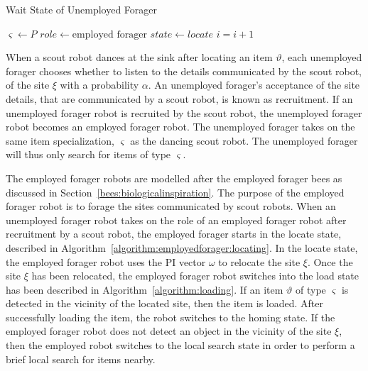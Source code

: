 \begin{algorithm}
\caption{Wait State of Unemployed Forager}
\label{algorithm:unemployedforager:locating}
\begin{algorithmic}[1]
	\State $\varsigma \gets P$
	\State {}
	\State $role \gets \text{employed forager}$
	\State $state \gets locate$
\EndIf
\State $i =i + 1$
\EndFunction
\end{algorithmic}
\end{algorithm}

When a scout robot dances at the sink after locating an item $\vartheta$, each unemployed forager chooses whether to listen to the details communicated by the scout robot, of the site $\xi$ with a probability $\alpha$. An unemployed forager's acceptance of the site details, that are communicated by a scout robot, is known as recruitment. If an unemployed forager robot is recruited by the scout robot, the unemployed forager robot becomes an employed forager robot. The unemployed forager takes on the same item specialization, $\varsigma$ as the dancing scout robot. The unemployed forager will thus only search for items of type $\varsigma$. 

The employed forager robots are modelled after the employed forager bees as discussed in Section~\ref{bees:biologicalinspiration}. The purpose of the employed forager robot is to forage the sites communicated by scout robots. When an unemployed forager robot takes on the role of an employed forager robot after recruitment by a scout robot, the employed forager starts in the locate state, described in Algorithm~\ref{algorithm:employedforager:locating}. In the locate state, the employed forager robot uses the PI vector $\omega$ to relocate the site $\xi$. Once the site $\xi$ has been relocated, the employed forager robot switches into the load state has been described in Algorithm~\ref{algorithm:loading}. If an item $\vartheta$ of type $\varsigma$ is detected in the vicinity of the located site, then the item is loaded. After successfully loading the item, the robot switches to the homing state. If the employed forager robot does not detect an object in the vicinity of the site $\xi$, then the employed robot switches to the local search state in order to perform a brief local search for items nearby. 

